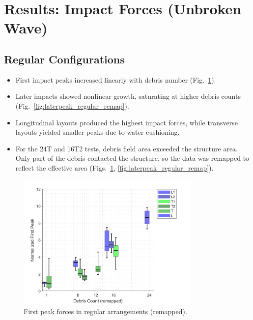 \documentclass{article}
\begin{document}
\section{Results: Impact Forces (Unbroken Wave)}

\subsection{Regular Configurations}
\begin{itemize}
    \item First impact peaks increased linearly with debris number (Fig.~\ref{fig:firstpeak_regular_remap}).
    \item Later impacts showed nonlinear growth, saturating at higher debris counts (Fig.~\ref{fig:laterpeak_regular_remap}).
    \item Longitudinal layouts produced the highest impact forces, while transverse layouts yielded smaller peaks due to water cushioning.
    \item For the 24T and 16T2 tests, debris field area exceeded the structure area. Only part of the debris contacted the structure, so the data was remapped to reflect the effective area (Figs.~\ref{fig:firstpeak_regular_remap}, \ref{fig:laterpeak_regular_remap}).
\end{itemize}

\begin{figure}[htbp]
    \centering
    \includegraphics[width=0.8\textwidth]{FirstPeak_Regular_RemappedT.png}
    \caption{First peak forces in regular arrangements (remapped).}
    \label{fig:firstpeak_regular_remap}
\end{figure}
\end{document}
